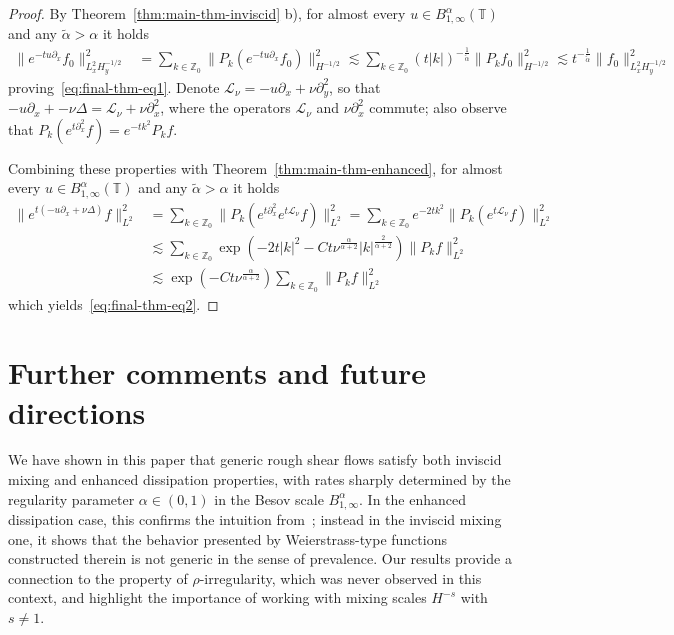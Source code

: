 \documentclass[11pt,oneside,reqno]{amsart}
\numberwithin{equation}{section}
\begin{document}
\begin{proof}
  By Theorem~\ref{thm:main-thm-inviscid} b), for almost every $u \in
  B^{\alpha}_{1, \infty} (\mathbb{T})$ and any $\tilde{\alpha} > \alpha$ it
  holds
%  
  \begin{align*}
    \| e^{- t u \partial_x} f_0 \|_{{L^2_x}  H^{- 1 / 2}_y}^2 & = \sum_{k \in
    \mathbb{Z}_0} \| P_k (e^{- t u \partial_x} f_0) \|_{H^{- 1 / 2}}^2
    \lesssim \sum_{k \in \mathbb{Z}_0} (t | k |)^{- \frac{1}{\tilde{\alpha}}}
    \| P_k f_0 \|_{H^{- 1 / 2}}^2 \lesssim t^{- \frac{1}{\tilde{\alpha}}} \|
    f_0 \|_{{L^2_x}  H^{- 1 / 2}_y}^2
  \end{align*}
%  
  proving~\eqref{eq:final-thm-eq1}. Denote $\mathcal{L}_{\nu} = - u \partial_x
  + \nu \partial_y^2$, so that $- u \partial_x + - \nu \Delta =
  \mathcal{L}_{\nu} + \nu \partial_x^2$, where the operators
  $\mathcal{L}_{\nu}$ and $\nu \partial_x^2$ commute; also observe that $P_k
  (e^{t \partial_x^2} f) = e^{- t k^2} P_k  f$.
  
  Combining these properties with Theorem~\ref{thm:main-thm-enhanced}, for
  almost every $u \in B^{\alpha}_{1, \infty} (\mathbb{T})$ and any
  $\tilde{\alpha} > \alpha$ it holds
%  
  \begin{align*}
    \| e^{t (- u \partial_x + \nu \Delta)} f \|_{L^2}^2 & = \sum_{k \in
    \mathbb{Z}_0} \| P_k (e^{t \partial_x^2} e^{t \mathcal{L}_{\nu}} f)
    \|_{L^2}^2 = \sum_{k \in \mathbb{Z}_0} e^{- 2 t k^2} \| P_k (e^{t
    \mathcal{L}_{\nu}} f) \|_{L^2}^2\\
    & \lesssim \sum_{k \in \mathbb{Z}_0} \exp \left( - 2 t | k |^2 - C t
    \nu^{\frac{\alpha}{\alpha + 2}} | k |^{\frac{2}{\alpha + 2}} \right) \|
    P_k f \|_{L^2}^2\\
    & \lesssim \exp \left( - C t \nu^{\frac{\alpha}{\alpha + 2}} \right)
    \sum_{k \in \mathbb{Z}_0} \| P_k f \|_{L^2}^2
  \end{align*}
%  
  which yields~\eqref{eq:final-thm-eq2}.
\end{proof}

\section{Further comments and future directions}

We have shown in this paper that generic rough shear flows satisfy both
inviscid mixing and enhanced dissipation properties, with rates sharply
determined by the regularity parameter $\alpha \in (0, 1)$ in the Besov scale
$B^{\alpha}_{1, \infty}$. In the enhanced dissipation case, this confirms the
intuition from~{\cite{colombozelati}}; instead in the inviscid mixing one, it
shows that the behavior presented by Weierstrass-type functions constructed
therein is not generic in the sense of prevalence. Our results provide a
connection to the property of $\rho$-irregularity, which was never observed in
this context, and highlight the importance of working with mixing scales $H^{-
s}$ with $s \neq 1$.
\end{document}
